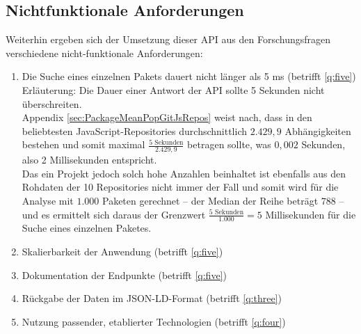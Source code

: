 \subsection{Nichtfunktionale Anforderungen} \label{sec:N_Anforderungen}
    Weiterhin ergeben sich der Umsetzung dieser \ac{API} aus den Forschungsfragen verschiedene nicht-funktionale Anforderungen:
    \begin{enumerate}[label=\textbf{NFRQ-\Roman*}, leftmargin=2.5cm]
        \item Die Suche eines einzelnen Pakets dauert nicht länger als 5 ms (betrifft \ref{q:five}) \label{nf:one}
        \\
        Erläuterung:
        Die Dauer einer Antwort der API sollte 5 Sekunden nicht überschreiten.\textsuperscript{\cite{link:ApiResponseTime}}
        \\
        Appendix \ref{sec:PackageMeanPopGitJsRepos} weist nach, dass in den beliebtesten JavaScript-Repositories durchschnittlich $2.429,9$ Abhängigkeiten bestehen und somit maximal $\frac{5\text{ Sekunden}}{2.429,9}$ betragen sollte, was $0,002$ Sekunden, also 2 Millisekunden entspricht.
        \\
        Das ein Projekt jedoch solch hohe Anzahlen beinhaltet ist ebenfalls aus den Rohdaten der 10 Repositories nicht immer der Fall und somit wird für die Analyse mit $1.000$ Paketen gerechnet -- der Median der Reihe beträgt $788$ -- und es ermittelt sich daraus der Grenzwert $\frac{5\text{ Sekunden}}{1.000} = 5$ Millisekunden für die Suche eines einzelnen Paketes.
        \item Skalierbarkeit der Anwendung (betrifft \ref{q:five}) \label{nf:two}
        \item Dokumentation der Endpunkte (betrifft \ref{q:five}) \label{nf:three}
        \item Rückgabe der Daten im \acs{JSON-LD}-Format (betrifft \ref{q:three}) \label{nf:four}
        \item Nutzung passender, etablierter Technologien (betrifft \ref{q:four}) \label{nf:five}
    \end{enumerate}